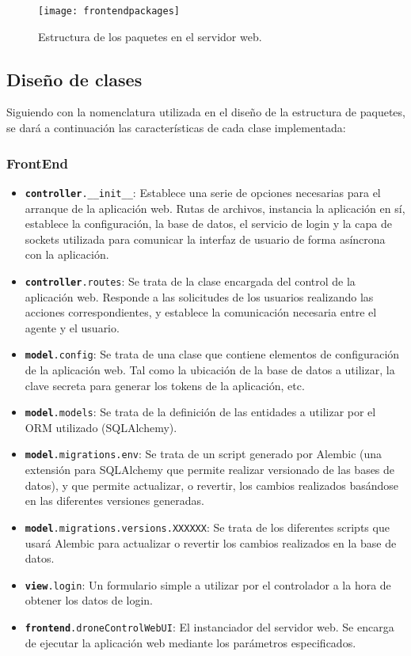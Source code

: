 \begin{figure}
	\centering
	\texttt{[image: frontendpackages]}
	\caption[Estructura de paquetes en servidor web]{Estructura de los paquetes en el servidor web.}\label{fig:frontpackages}
\end{figure}

\subsection{Diseño de clases}

Siguiendo con la nomenclatura utilizada en el diseño de la estructura de paquetes, se dará a continuación las características de cada clase implementada: 
\subsubsection{FrontEnd}
\begin{itemize}
\item \texttt{\textbf{controller}.\_\_init\_\_}: Establece una serie de opciones necesarias para el arranque de la aplicación web. Rutas de archivos, instancia la aplicación en sí, establece la configuración, la base de datos, el servicio de login y la capa de sockets utilizada para comunicar la interfaz de usuario de forma asíncrona con la aplicación.
\item \texttt{\textbf{controller}.routes}: Se trata de la clase encargada del control de la aplicación web. Responde a las solicitudes de los usuarios realizando las acciones correspondientes, y establece la comunicación necesaria entre el agente y el usuario.
\item \texttt{\textbf{model}.config}: Se trata de una clase que contiene elementos de configuración de la aplicación web. Tal como la ubicación de la base de datos a utilizar, la clave secreta para generar los tokens de la aplicación, etc.
\item \texttt{\textbf{model}.models}: Se trata de la definición de las entidades a utilizar por el ORM utilizado (SQLAlchemy).
\item \texttt{\textbf{model}.migrations.env}: Se trata de un script generado por Alembic (una extensión para SQLAlchemy que permite realizar versionado de las bases de datos), y que permite actualizar, o revertir, los cambios realizados basándose en las diferentes versiones generadas. 
\item \texttt{\textbf{model}.migrations.versions.XXXXXX}: Se trata de los diferentes scripts que usará Alembic para actualizar o revertir los cambios realizados en la base de datos.
\item \texttt{\textbf{view}.login}: Un formulario simple a utilizar por el controlador a la hora de obtener los datos de login.
\item \texttt{\textbf{frontend}.droneControlWebUI}: El instanciador del servidor web. Se encarga de ejecutar la aplicación web mediante los parámetros especificados.
\end{itemize}


